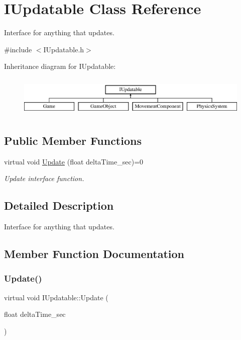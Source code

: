 \hypertarget{class_i_updatable}{}\section{I\+Updatable Class Reference}
\label{class_i_updatable}


Interface for anything that updates.  




{\ttfamily \#include $<$I\+Updatable.\+h$>$}

Inheritance diagram for I\+Updatable\+:\begin{figure}[H]
\begin{center}
\leavevmode
\includegraphics[height=1.985816cm]{class_i_updatable}
\end{center}
\end{figure}
\subsection*{Public Member Functions}
\begin{DoxyCompactItemize}
\item 
virtual void \mbox{\hyperlink{class_i_updatable_a291a40a3422a0b02ef4c10e1d1570eb0}{Update}} (float delta\+Time\+\_\+sec)=0
\begin{DoxyCompactList}\small\item\em Update interface function. \end{DoxyCompactList}\end{DoxyCompactItemize}


\subsection{Detailed Description}
Interface for anything that updates. 

\subsection{Member Function Documentation}
\mbox{\label{class_i_updatable_a291a40a3422a0b02ef4c10e1d1570eb0}} 
\subsubsection{\texorpdfstring{Update()}{Update()}}
{\footnotesize\ttfamily virtual void I\+Updatable\+::\+Update (\begin{DoxyParamCaption}\item[{float}]{delta\+Time\+\_\+sec }\end{DoxyParamCaption})\hspace{0.3cm}{\ttfamily [pure virtual]}}



